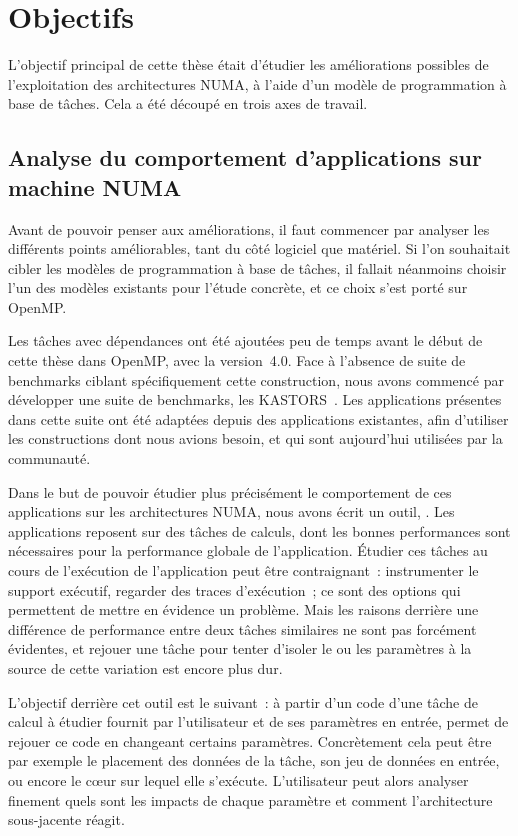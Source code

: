 \section{Objectifs}\label{sec:intro:objectives}

L'objectif principal de cette thèse était d'étudier les améliorations possibles de l'exploitation des architectures NUMA, à l'aide d'un modèle de programmation à base de tâches.
Cela a été découpé en trois axes de travail.


\subsection*{Analyse du comportement d'applications sur machine NUMA}

Avant de pouvoir penser aux améliorations, il faut commencer par analyser les différents points améliorables, tant du côté logiciel que matériel.
Si l'on souhaitait cibler les modèles de programmation à base de tâches, il fallait néanmoins choisir l'un des modèles existants pour l'étude concrète, et ce choix s'est porté sur OpenMP.

Les tâches avec dépendances ont été ajoutées peu de temps avant le début de cette thèse dans OpenMP, avec la version~4.0. Face à l'absence de suite de benchmarks ciblant spécifiquement cette construction, nous avons commencé par développer une suite de benchmarks, les KASTORS~\cite{Virouleau2014}.
Les applications présentes dans cette suite ont été adaptées depuis des applications existantes, afin d'utiliser les constructions dont nous avions besoin, et qui sont aujourd'hui utilisées par la communauté.


Dans le but de pouvoir étudier plus précisément le comportement de ces applications sur les architectures NUMA, nous avons écrit un outil, \outil.
Les applications reposent sur des tâches de calculs, dont les bonnes performances sont nécessaires pour la performance globale de l'application.
Étudier ces tâches au cours de l'exécution de l'application peut être contraignant~: instrumenter le support exécutif, regarder des traces d'exécution~; ce sont des options qui permettent de mettre en évidence un problème.
Mais les raisons derrière une différence de performance entre deux tâches similaires ne sont pas forcément évidentes, et rejouer une tâche pour tenter d'isoler le ou les paramètres à la source de cette variation est encore plus dur.

L'objectif derrière cet outil est le suivant~: à partir d'un code d'une tâche de calcul à étudier fournit par l'utilisateur et de ses paramètres en entrée, \outil permet de rejouer ce code en changeant certains paramètres.
Concrètement cela peut être par exemple le placement des données de la tâche, son jeu de données en entrée, ou encore le cœur sur lequel elle s'exécute.
L'utilisateur peut alors analyser finement quels sont les impacts de chaque paramètre et comment l'architecture sous-jacente réagit.



